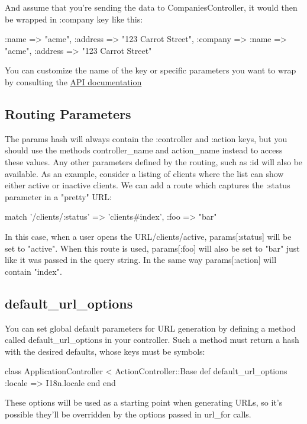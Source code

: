 \documentclass[10pt]{book}
\newenvironment{code}{%
  \scriptsize
    \verbatim
}{%
    \endverbatim
    \newline
}
\begin{document}
And assume that you’re sending the data to CompaniesController, it would then be wrapped in :company key like this:
\begin{code}
{ :name => "acme", :address => "123 Carrot Street", 
:company => { :name => "acme", :address => "123 Carrot Street" }}
\end{code}

You can customize the name of the key or specific parameters you want to wrap by consulting the \href{http://api.rubyonrails.org/classes/ActionController/ParamsWrapper.html}{API documentation}

\subsection{ Routing Parameters}

The params hash will always contain the :controller and :action keys, but you should use the methods controller\_name and action\_name instead to access these values. Any other parameters defined by the routing, such as :id  will also be available. As an example, consider a listing of clients  where the list can show either active or inactive clients. We can add a  route which captures the :status parameter in a "pretty" URL:
\begin{code}
match '/clients/:status' => 'clients#index', :foo => "bar"
\end{code}

In this case, when a user opens the URL/clients/active, params[:status] will be set to "active". When this route is used, params[:foo] will also be set to "bar" just like it was passed in the query string. In the same way params[:action] will contain "index".

\subsection{ default\_url\_options}

You can set global default parameters for URL generation by defining a method called default\_url\_options in your controller. Such a method must return a hash with the desired defaults, whose keys must be symbols:
\begin{code}
class ApplicationController < ActionController::Base
  def default_url_options
    {:locale => I18n.locale}
  end
end
\end{code}

These options will be used as a starting point when generating URLs,  so it’s possible they’ll be overridden by the options passed in url\_for calls.
\end{document}
